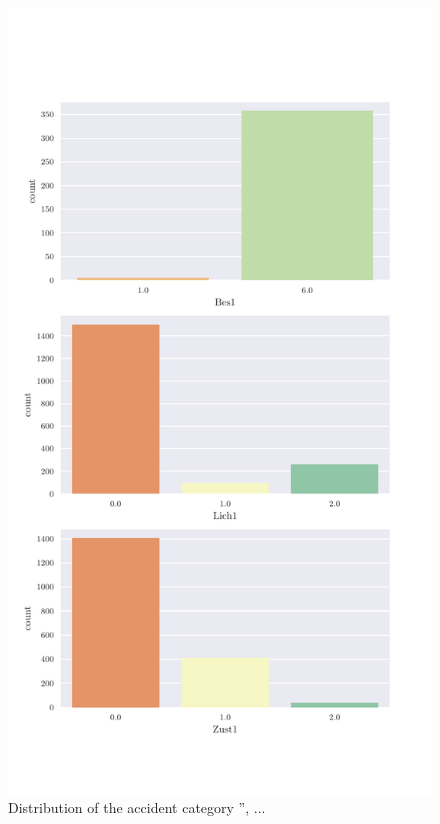 \documentclass[a4paper,headsepline,footsepline,fontsize=11pt,BCOR=12mm,DIV=12]{report}
\begin{document}
\begin{appendices}
\begin{figure}[h]
	\centering
	\includegraphics[scale=0.7]{../CorrAnalysis/data/BAYSIS/02_matched/plots/baysis_matched_count_multiple04}
	\caption{Distribution of the accident category '', ...}
	\label{img:appendix_baysis_matched_04}
\end{figure}
% 	


\end{appendices}
\end{document}
